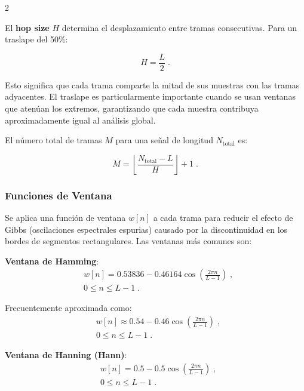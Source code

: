 \documentclass[12pt]{report}
\newenvironment{tightmulticols}{%
  \begin{multicols}{2}
  \setlength{\parskip}{1.2pt}
  \linespread{1}\selectfont
}{%
  \end{multicols}
}
\begin{document}
\begin{tightmulticols}
\par El \textbf{hop size} $H$ determina el desplazamiento entre tramas consecutivas. Para un traslape del 50\%:

\begin{equation*}
    H = \frac{L}{2} \; .
\end{equation*}

\noindent Esto significa que cada trama comparte la mitad de sus muestras con las tramas adyacentes. El traslape es particularmente importante cuando se usan ventanas que atenúan los extremos, garantizando que cada muestra contribuya aproximadamente igual al análisis global.

\par El número total de tramas $M$ para una señal de longitud $N_{\text{total}}$ es:

\begin{equation*}
    M = \left\lfloor \frac{N_{\text{total}} - L}{H} \right\rfloor + 1 \; .
\end{equation*}

\subsubsection{Funciones de Ventana}

\noindent Se aplica una función de ventana $w[n]$ a cada trama para reducir el efecto de Gibbs (oscilaciones espectrales espurias) causado por la discontinuidad en los bordes de segmentos rectangulares. Las ventanas más comunes son:

\noindent\textbf{Ventana de Hamming}:
\begin{equation*}
    \begin{split}
        &w[n] = 0.53836 - 0.46164 \cos\left(\frac{2\pi n}{L-1}\right) \; , \\[0.6ex]
        &0 \leq n \leq L-1 \; .
    \end{split}
\end{equation*}

\noindent Frecuentemente aproximada como:
\begin{equation*}
    \begin{split}
        &w[n] \approx 0.54 - 0.46 \cos\left(\frac{2\pi n}{L-1}\right) \; , \\[0.6ex]
        &0 \leq n \leq L-1 \; .
    \end{split}
\end{equation*}

\noindent\textbf{Ventana de Hanning (Hann)}:
\begin{equation*}
    \begin{split}
        &w[n] = 0.5 - 0.5 \cos\left(\frac{2\pi n}{L-1}\right) \; , \\[0.6ex]
        &0 \leq n \leq L-1 \; .
    \end{split}
\end{equation*}


\end{tightmulticols}
\end{document}
